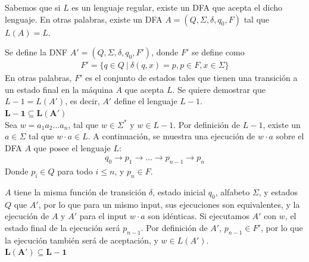 \documentclass[letter]{article}
\begin{document}
	
\begin{pregunta}{1} %

Sabemos que si $L$ es un lenguaje regular, existe un DFA que acepta el dicho lenguaje. En otras palabras, existe un DFA $A = (Q, \Sigma, \delta, q_0, F)$ tal que $L(A) = L$.

Se define la DNF $A' = (Q, \Sigma, \delta, q_0, F')$, donde $F'$ se define como
\begin{align*}
    F' =  \{ q \in Q \ | \ \delta(q, x) = p, p \in F,  x \in \Sigma \}
\end{align*}
En otras palabras, $F'$ es el conjunto de estados tales que tienen una transición a un estado final en la máquina $A$ que acepta $L$. Se quiere demostrar que $L - 1 = L(A')$, es decir, $A'$ define el lenguaje $L - 1$. \\

$\mathbf{L - 1 \subseteq L(A')}$ \\

Sea $w = a_1 a_2 ... a_n$, tal que $w \in \Sigma^*$ y $w \in L - 1$. Por definición de $L - 1$, existe un $a \in \Sigma$ tal que $w \cdot a \in L$. A continuación, se muestra una ejecución de $w \cdot a$ sobre el DFA $A$ que posee el lenguaje $L$:
\begin{align*}
    q_0 \rightarrow p_1 \rightarrow ... \rightarrow p_{n-1} \rightarrow p_n
\end{align*}
Donde $p_i \in Q$ para todo $i \leq n$, y $p_n \in F$.

$A$ tiene la misma función de transición $\delta$, estado inicial $q_0$, alfabeto $\Sigma$, y estados $Q$ que $A'$, por lo que para un mismo input, sus ejecuciones son equivalentes, y la ejecución de $A$ y $A'$ para el input $w \cdot a$ son idénticas. Si ejecutamos $A'$ con $w$, el estado final de la ejecución será $p_{n-1}$. Por definición de $A'$, $p_{n-1} \in F'$, por lo que la ejecución también será de aceptación, y $w \in L(A')$. \\


$\mathbf{L(A') \subseteq L - 1}$ \\


\end{pregunta}
\end{document}
